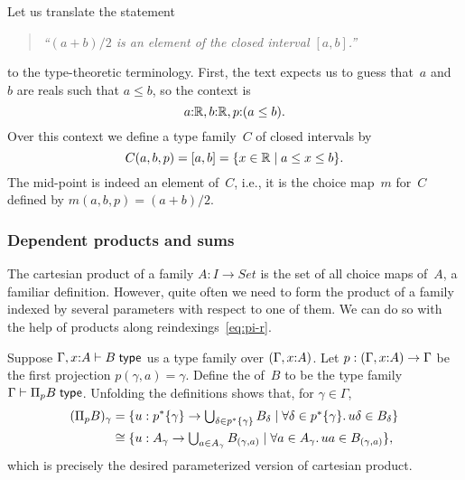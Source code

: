 \begin{example}
  Let us translate the statement
  \begin{quote}
    \emph{``$(a + b)/2$ is an element of the closed interval $[a,b]$.''}
  \end{quote}
  to the type-theoretic terminology. First, the text expects us to guess that~$a$ and~$b$ are reals such that $a \leq b$, so the context is
  \begin{equation*}
    a {:} \mathbb{R}, b {:} \mathbb{R}, p {:} (a \leq b).
  \end{equation*}
  Over this context we define a type family~$C$ of closed intervals by
  \begin{equation*}
    C(a, b, p) = [a, b] = \{x \in \mathbb{R} \mid a \leq x \leq b\}.
  \end{equation*}
  The mid-point is indeed an element of~$C$, i.e., it is the choice map~$m$ for~$C$ defined by $m(a, b, p) = (a + b)/2$.
\end{example}

\subsubsection{Dependent products and sums}
\label{sec:depend-sums-prod-in-sets}

The cartesian product of a family $A : I \to Set$ is the set of all choice maps of~$A$, a familiar definition. However, quite often we need to form the product of a family indexed by several parameters with respect to one of them. We can do so with the help of products along reindexings~\eqref{eq:pi-r}.

Suppose $\Gamma, x {:} A \vdash B \;\mathsf{type}$ us a type family over $(\Gamma, x {:} A)$.
Let $p : (\Gamma, x {:} A) \to \Gamma$ be the first projection $p(\gamma, a) = \gamma$.
Define the  of~$B$ to be the type family $\Gamma \vdash \Pi_p B \;\mathsf{type}$.
Unfolding the definitions shows that, for $\gamma \in \Gamma$,
%
\begin{align*}
  (\Pi_p B)_\gamma &=
  \{ u : p^{*} \{\gamma\} \to
        \textstyle\bigcup_{\delta \in p^{*} \{\gamma\}} B_\delta
    \mid \forall \delta \in p^{*} \{\gamma\} .\, u \delta \in B_\delta
  \} \\
  &\cong
  \{ u : A_\gamma \to
        \textstyle\bigcup_{a \in A_\gamma} B_{(\gamma, a)}
    \mid \forall a \in A_\gamma .\, u a \in B_{(\gamma, a)}
  \},
\end{align*}
%
which is precisely the desired parameterized version of cartesian product.

